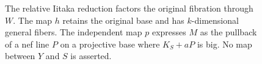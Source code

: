 \begin{figure}[ht]
\centering
{}
\caption{The relative Iitaka reduction factors the original fibration
through $W$. The map $h$ retains the original base and has
$k$-dimensional general fibers. The independent map $p$ expresses
$M$ as the pullback of a nef line $P$ on a projective base where
$K_S+aP$ is big. No map between $Y$ and $S$ is asserted.}
\label{fig:iitaka-period}
\end{figure}
